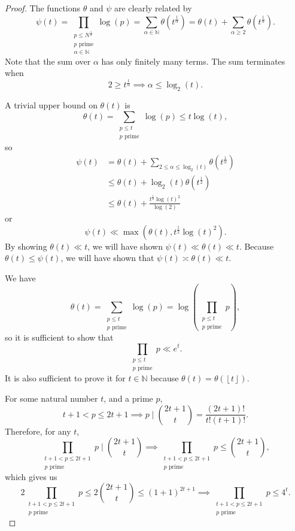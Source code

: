 \documentclass[12pt,reqno]{amsart}
\begin{document}
\begin{proof}
The functions \(\theta\) and \(\psi\) are clearly related by
\[
    \psi(t) = \prod _{\substack{ p \leq N^{\frac{1}{\alpha} } \\ p \text{ prime} \\ \alpha \in \mathbb{N}  }} \log \left( p \right) = \sum _{\alpha \in \mathbb{N} } \theta\left( t ^{\frac{1}{\alpha} } \right)  = \theta(t) + \sum _{\alpha \geq 2} \theta \left( t ^{\frac{1}{\alpha} } \right) 
.\]
Note that the sum over \(\alpha\) has only finitely many terms. The sum terminates when
\[
    2 \geq  t^{\frac{1}{\alpha} } \implies  \alpha \leq \log _{2} \left( t \right) 
.\]

A trivial upper bound on \(\theta (t)\) is
\[
    \theta(t) = \sum _{\substack{ p \leq t \\ p \text{ prime}}} \log \left( p \right) \leq t \log \left( t \right)  
,\]
so
\begin{align*}
    \psi(t) & = \theta(t) + \sum _{2 \leq \alpha \leq \log _{2} \left( t \right) } \theta(t ^{\frac{1}{\alpha} }) \\
    & \leq \theta(t) + \log _{2} \left( t \right) \theta(t^{\frac{1}{2} }) \\
    & \leq \theta(t) + \frac{t^{\frac{1}{2} }\log \left( t \right) ^{2}}{\log \left( 2 \right) }
\end{align*}
or
\[
    \psi(t) \ll \max \left( \theta(t), t^{\frac{1}{2} }\log \left( t \right) ^{2} \right) 
.\]
By showing \(\theta(t) \ll t\), we will have shown \(\psi(t) \ll \theta(t) \ll t\). Because \(\theta(t) \leq \psi(t)\),
we will have shown that \(\psi(t) \asymp \theta(t) \ll t\).

We have
\[
    \theta(t) = \sum _{\substack{ p \leq t \\ p \text{ prime}  }} \log \left( p \right) = \log \left( \prod _{\substack{ p \leq t \\  p \text{ prime}  }} p \right) 
,\]
so it is sufficient to show that
\[
    \prod _{\substack{ p \leq t \\ p \text{ prime}  }} p \ll e^{t}
.\]
It is also sufficient to prove it for \(t \in \mathbb{N} \) because \(\theta(t) = \theta\left( \left\lfloor t \right\rfloor  \right) \).

For some natural number \(t\), and a prime \(p\),
\[
    t + 1 < p \leq 2t + 1 \implies p \mid \binom{2t + 1}{t} = \frac{\left( 2t + 1 \right) !}{t! (t+1)!} 
.\]
Therefore, for any \(t\),
\[
    \prod _{\substack{ t + 1 < p \leq 2t + 1\\ p \text{ prime}   }} p   \mid \binom{2t+1}{t} \implies \prod _{\substack{ t + 1 < p \leq 2t + 1\\ p \text{ prime}   }} p   \leq  \binom{2t+1}{t}
,\]
which gives us
\[
    2 \prod _{\substack{ t + 1 < p \leq 2t + 1\\ p \text{ prime}   }} p   \leq  2 \binom{2t+1}{t} \leq (1+1)^{2t + 1} \implies \prod _{\substack{ t + 1 < p \leq 2t + 1\\ p \text{ prime}   }} p  \leq 4^{t}
.\]


\end{proof}
\end{document}

